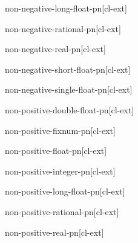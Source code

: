 \documentclass[10pt,english]{book}
\begin{document}
\begin{function}{non-negative-long-float-p}{n}[cl-ext]
  
\end{function}

\begin{function}{non-negative-rational-p}{n}[cl-ext]
  
\end{function}

\begin{function}{non-negative-real-p}{n}[cl-ext]
  
\end{function}

\begin{function}{non-negative-short-float-p}{n}[cl-ext]
  
\end{function}

\begin{function}{non-negative-single-float-p}{n}[cl-ext]
  
\end{function}

\begin{function}{non-positive-double-float-p}{n}[cl-ext]
  
\end{function}

\begin{function}{non-positive-fixnum-p}{n}[cl-ext]
  
\end{function}

\begin{function}{non-positive-float-p}{n}[cl-ext]
  
\end{function}

\begin{function}{non-positive-integer-p}{n}[cl-ext]
  
\end{function}

\begin{function}{non-positive-long-float-p}{n}[cl-ext]
  
\end{function}

\begin{function}{non-positive-rational-p}{n}[cl-ext]
  
\end{function}

\begin{function}{non-positive-real-p}{n}[cl-ext]
  
\end{function}
\end{document}
